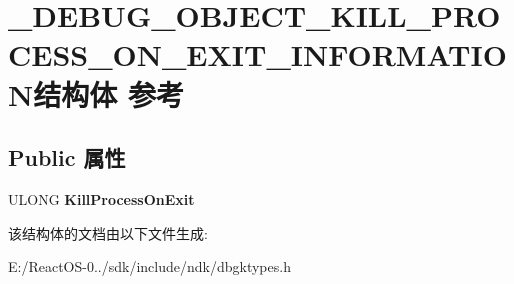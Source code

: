 \hypertarget{struct___d_e_b_u_g___o_b_j_e_c_t___k_i_l_l___p_r_o_c_e_s_s___o_n___e_x_i_t___i_n_f_o_r_m_a_t_i_o_n}{}\section{\+\_\+\+D\+E\+B\+U\+G\+\_\+\+O\+B\+J\+E\+C\+T\+\_\+\+K\+I\+L\+L\+\_\+\+P\+R\+O\+C\+E\+S\+S\+\_\+\+O\+N\+\_\+\+E\+X\+I\+T\+\_\+\+I\+N\+F\+O\+R\+M\+A\+T\+I\+O\+N结构体 参考}
\label{struct___d_e_b_u_g___o_b_j_e_c_t___k_i_l_l___p_r_o_c_e_s_s___o_n___e_x_i_t___i_n_f_o_r_m_a_t_i_o_n}
\subsection*{Public 属性}
\begin{DoxyCompactItemize}
\item 
\mbox{\label{struct___d_e_b_u_g___o_b_j_e_c_t___k_i_l_l___p_r_o_c_e_s_s___o_n___e_x_i_t___i_n_f_o_r_m_a_t_i_o_n_a2a5d14fa8e1b348359a17eb59bc37c49}} 
U\+L\+O\+NG {\bfseries Kill\+Process\+On\+Exit}
\end{DoxyCompactItemize}


该结构体的文档由以下文件生成\+:\begin{DoxyCompactItemize}
\item 
E\+:/\+React\+O\+S-\/0../sdk/include/ndk/dbgktypes.\+h\end{DoxyCompactItemize}
